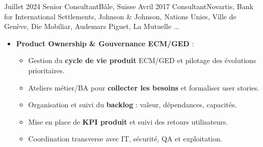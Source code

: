 %
%
%

\begin{experiences}

\consultantexperience
    {Juillet 2024} {Senior Consultant}{}{Bâle, Suisse}
    {Avril 2017}    {Consultant}{Novartis, Bank for International Settlements, Johnson \& Johnson, Nations Unies, Ville de Genève, Die Mobiliar, Audemars Piguet, La Mutuelle ...} {
        \begin{itemize}[left=0pt,label={},itemsep=0.5em]
        \vspace{0.3em}  %
          \item \textbf{Product Ownership \& Gouvernance ECM/GED} :
            \begin{itemize}[itemsep=0.2em,topsep=0.2em,parsep=0pt]
              \small
              \item Gestion du \textbf{cycle de vie produit} ECM/GED et pilotage des évolutions prioritaires.
              \item Ateliers métier/BA pour \textbf{collecter les besoins} et formaliser user stories.
              \item Organisation et suivi du \textbf{backlog} : valeur, dépendances, capacités.
              \item Mise en place de \textbf{KPI produit} et suivi des retours utilisateurs.
              \item Coordination transverse avec IT, sécurité, QA et exploitation.
            \end{itemize}


\end{itemize}}
\end{experiences}
